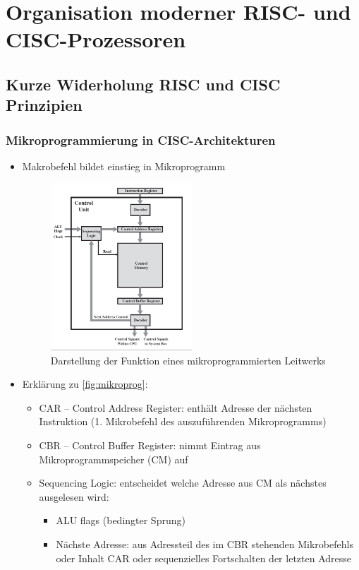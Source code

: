 
\section{Organisation moderner RISC- und CISC-Prozessoren}

\subsection{Kurze Widerholung RISC und CISC Prinzipien}
\subsubsection{Mikroprogrammierung in CISC-Architekturen}
\begin{itemize}
	\item
		Makrobefehl bildet einstieg in Mikroprogramm

		\begin{figure}[hpbt]
			\centering
			\includegraphics[width=0.5\textwidth]{img/leitwerk_mikro.png}
			\caption{Darstellung der Funktion eines mikroprogrammierten Leitwerks}
			\label{fig:mikroprog}
		\end{figure}
		\item
			Erklärung zu \autoref{fig:mikroprog}:
			\begin{itemize}
				\item
					CAR -- Control Address Register: enthält Adresse der nächsten Instruktion (1. Mikrobefehl des auszuführenden Mikroprogramms)
				\item
					CBR -- Control Buffer Register: nimmt Eintrag aus Mikroprogrammspeicher (CM) auf
				\item
					Sequencing Logic: entscheidet welche Adresse aus CM als nächstes ausgelesen wird:
					\begin{itemize}
						\item
							ALU flags (bedingter Sprung)
						\item
							Nächste Adresse: aus Adressteil des im CBR stehenden Mikrobefehls oder Inhalt CAR oder sequenzielles Fortschalten der letzten Adresse


\end{itemize}
\end{itemize}
\end{itemize}
